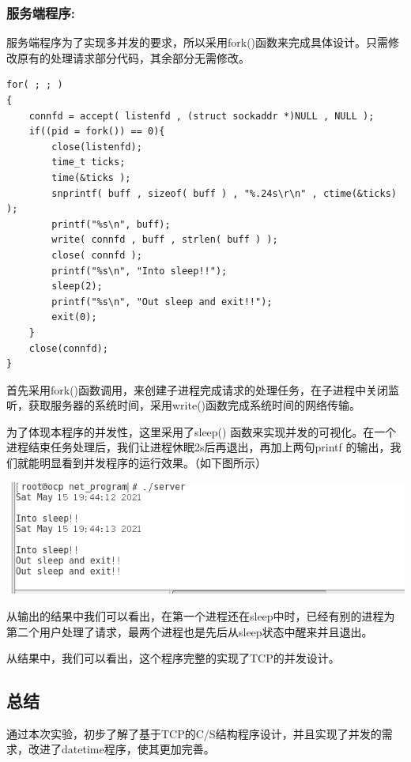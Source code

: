 \documentclass[UTF8]{ctexart}
\begin{document}
\subsubsection{服务端程序:}{服务端程序为了实现多并发的要求，所以采用fork()函数来完成具体设计。只需修改原有的处理请求部分代码，其余部分无需修改。}
\par{}
\begin{lstlisting}
for( ; ; )
{
    connfd = accept( listenfd , (struct sockaddr *)NULL , NULL );
    if((pid = fork()) == 0){
    	close(listenfd);
    	time_t ticks;
    	time(&ticks );
    	snprintf( buff , sizeof( buff ) , "%.24s\r\n" , ctime(&ticks) );
    	printf("%s\n", buff);
    	write( connfd , buff , strlen( buff ) );
    	close( connfd );
    	printf("%s\n", "Into sleep!!");
    	sleep(2);
    	printf("%s\n", "Out sleep and exit!!");
    	exit(0);
    }
    close(connfd);
}
\end{lstlisting}\par{首先采用fork()函数调用，来创建子进程完成请求的处理任务，在子进程中关闭监听，获取服务器的系统时间，采用write()函数完成系统时间的网络传输。}\par{为了体现本程序的并发性，这里采用了sleep() 函数来实现并发的可视化。在一个进程结束任务处理后，我们让进程休眠2s后再退出，再加上两句printf 的输出，我们就能明显看到并发程序的运行效果。（如下图所示）}\par
\includegraphics[scale=0.6]{result}\par{从输出的结果中我们可以看出，在第一个进程还在sleep中时，已经有别的进程为第二个用户处理了请求，最两个进程也是先后从sleep状态中醒来并且退出。}\par{从结果中，我们可以看出，这个程序完整的实现了TCP的并发设计。}
\subsection{总结}
\par{通过本次实验，初步了解了基于TCP的C/S结构程序设计，并且实现了并发的需求，改进了datetime程序，使其更加完善。}
\end{document}
